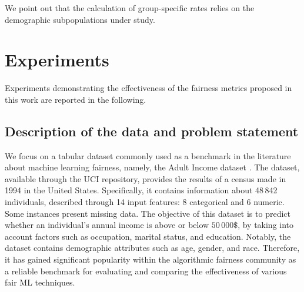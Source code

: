 \documentclass[letterpaper]{article} %
\begin{document}
% 
We point out that the calculation of group-specific rates relies on the demographic subpopulations under study.

\section{Experiments}

Experiments demonstrating the effectiveness of the fairness metrics proposed in this work are reported in the following.

\subsection{Description of the data and problem statement}
We focus on a tabular dataset commonly used as a benchmark in the literature about machine learning fairness, namely, the Adult Income dataset \cite{Dua_2019}.
%
The dataset, available through the UCI repository, provides the results of a census made in 1994 in the United States. 
Specifically, it contains information about 48\,842 individuals, described through 14 input features: 8 categorical and 6 numeric.
Some instances present missing data.
The objective of this dataset is to predict whether an individual's annual income is above or below $50\,000\$$, by taking into account factors such as occupation, marital status, and education. 
Notably, the dataset contains demographic attributes such as age, gender, and race. 
Therefore, it has gained significant popularity within the algorithmic fairness community as a reliable benchmark for evaluating and comparing the effectiveness of various fair ML techniques.
%
\end{document}
